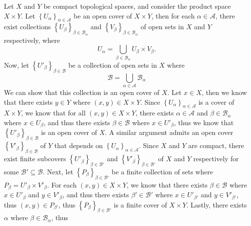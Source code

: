 \documentclass[12pt]{article}
\newcommand{\braces}[1]{\left\{#1\right\}}           %
\begin{document}
\pagestyle{fancy}
\fancyhead{}

\normalsize

Let $X$ and $Y$ be compact topological spaces, and consider the product space $X\times Y$. Let $\braces{U_\alpha}_{\alpha\in\mathcal{A}}$ be an open cover of $X\times Y$, then for each $\alpha\in\mathcal{A}$, there exist collections $\braces{U_\beta}_{\beta\in\mathcal{B}_\alpha}$ and $\braces{V_\beta}_{\beta\in\mathcal{B}_\alpha}$ of open sets in $X$ and $Y$ respectively, where
\[U_\alpha=\bigcup_{\beta\in\mathcal{B}_\alpha}U_\beta\times V_\beta.\]
Now, let $\braces{U'_\beta}_{\beta\in\mathcal{B}}$ be a collection of open sets in $X$ where
\[\mathcal{B}=\bigcup_{\alpha\in\mathcal{A}}\mathcal{B}_\alpha\]
We can show that this collection is an open cover of $X$. Let $x\in X$, then we know that there exists $y\in Y$ where $(x,y)\in X\times Y$. Since $\braces{U_\alpha}_{\alpha\in\mathcal{A}}$ is a cover of $X\times Y$, we know that for all $(x,y)\in X\times Y$, there exists $\alpha\in\mathcal{A}$ and $\beta\in\mathcal{B}_\alpha$ where $x\in U_\beta$, and thus there exists $\beta\in\mathcal{B}$ where $x\in U'_\beta$, thus we know that $\braces{U'_\beta}_{\beta\in\mathcal{B}}$ is an open cover of $X$. A similar argument admits an open cover $\braces{V'_\beta}_{\beta\in\mathcal{B}}$ of $Y$ that depends on $\braces{U_\alpha}_{\alpha\in\mathcal{A}}$. Since $X$ and $Y$ are compact, there exist finite subcovers $\braces{U'_\beta}_{\beta\in\mathcal{B}'}$ and $\braces{V'_\beta}_{\beta\in\mathcal{B}'}$ of $X$ and $Y$ respectively for some $\mathcal{B}'\subseteq\mathcal{B}$. Next, let $\braces{P_\beta}_{\beta\in\mathcal{B}'}$ be a finite collection of sets where $P_\beta=U'_\beta\times V'_\beta$. For each $(x,y)\in X\times Y$, we know that there exists $\beta\in\mathcal{B}$ where $x\in U'_\beta$ and $y\in V'_\beta$, and thus there exists $\beta'\in\mathcal{B}'$ where $x\in U'_{\beta'}$ and $y\in V'_{\beta'}$, thus $(x,y)\in P_{\beta'}$, thus $\braces{P_\beta}_{\beta\in\mathcal{B}'}$ is a finite cover of $X\times Y$. Lastly, there exists $\alpha$ where $\beta\in\mathcal{B}_\alpha$, thus 
\end{document}
